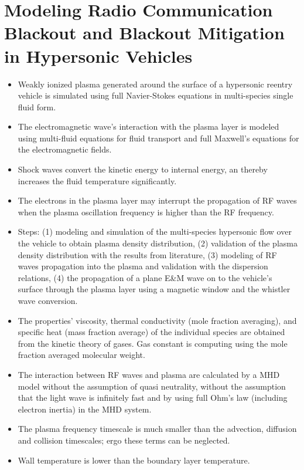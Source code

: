     \section{Modeling Radio Communication Blackout and Blackout Mitigation in Hypersonic Vehicles \cite{doi:10.2514/1.A33122}} 
        \begin{itemize} 
            \item Weakly ionized plasma generated around the surface of a hypersonic reentry vehicle is simulated using full Navier-Stokes equations in multi-species single fluid form.
            \item The electromagnetic wave's interaction with the plasma layer is modeled using multi-fluid equations for fluid transport and full Maxwell's equations for the electromagnetic fields. 
            \item Shock waves convert the kinetic energy to internal energy, an thereby increases the fluid temperature significantly.  
            \item The electrons in the plasma layer may interrupt the propagation of RF waves when the plasma oscillation frequency is higher than the RF frequency. 
            \item Steps: (1) modeling and simulation of the multi-species hypersonic flow over the vehicle to obtain plasma density distribution, (2) validation of the plasma density distribution with the results from literature, (3) modeling of RF waves propagation into the plasma and validation with the dispersion relations, (4) the propagation of a plane E\&M wave on to the vehicle's surface through the plasma layer using a magnetic window and the whistler wave conversion.
            \item The properties' viscosity, thermal conductivity (mole fraction averaging), and specific heat (mass fraction average) of the individual species are obtained from the kinetic theory of gases. Gas constant is computing using the mole fraction averaged molecular weight. 
            \item The interaction between RF waves and plasma are calculated by a MHD model without the assumption of quasi neutrality, without the assumption that the light wave is infinitely fast and by using full Ohm's law (including electron inertia) in the MHD system. 
            \item The plasma frequency timescale is much smaller than the advection, diffusion and collision timescales; ergo these terms can be neglected. 
            \item Wall temperature is lower than the boundary layer temperature. 

\end{itemize}
